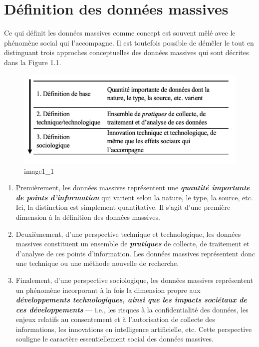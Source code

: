 \documentclass[
  letterpaper,
]{scrbook}
\begin{document}
\hypertarget{duxe9finition-des-donnuxe9es-massives}{%
\section{Définition des données
massives}\label{duxe9finition-des-donnuxe9es-massives}}

Ce qui définit les données massives comme concept est souvent mêlé avec
le phénomène social qui l'accompagne. Il est toutefois possible de
démêler le tout en distinguant trois approches conceptuelles des données
massives qui sont décrites dans la Figure 1.1.

\begin{figure}

{\centering \includegraphics{images/chapitre1_definitions.png}

}

\caption{image1\_1}

\end{figure}

\begin{enumerate}
\def\labelenumi{\arabic{enumi}.}
\item
  Premièrement, les données massives représentent une
  \textbf{\emph{quantité importante de points d'information}} qui
  varient selon la nature, le type, la source, etc. Ici, la distinction
  est simplement quantitative. Il s'agit d'une première dimension à la
  définition des données massives.
\item
  Deuxièmement, d'une perspective technique et technologique, les
  données massives constituent un ensemble de \textbf{\emph{pratiques}}
  de collecte, de traitement et d'analyse de ces points d'information.
  Les données massives représentent donc une technique ou une méthode
  nouvelle de recherche.
\item
  Finalement, d'une perspective sociologique, les données massives
  représentent un phénomène incorporant à la fois la dimension propre
  aux \textbf{\emph{développements technologiques, ainsi que les impacts
  sociétaux de ces développements}} --- i.e., les risques à la
  confidentialité des données, les enjeux relatifs au consentement et à
  l'autorisation de collecte des informations, les innovations en
  intelligence artificielle, etc. Cette perspective souligne le
  caractère essentiellement social des données massives.
\end{enumerate}
\end{document}
